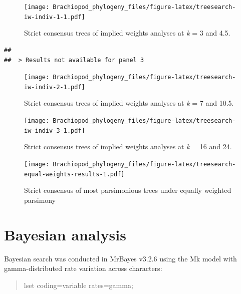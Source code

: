 \documentclass[openany]{book}
\begin{document}
\clearpage 

\begin{figure}
\centering
\texttt{[image: Brachiopod\_phylogeny\_files/figure-latex/treesearch-iw-indiv-1-1.pdf]}
\caption{\label{fig:treesearch-iw-indiv-1}Strict consensus trees of implied weights analyses
at \emph{k} = 3 and 4.5.}
\end{figure}

\clearpage 

\begin{verbatim}
## 
##  > Results not available for panel 3
\end{verbatim}

\begin{figure}
\centering
\texttt{[image: Brachiopod\_phylogeny\_files/figure-latex/treesearch-iw-indiv-2-1.pdf]}
\caption{\label{fig:treesearch-iw-indiv-2}Strict consensus trees of implied weights analyses
at \emph{k} = 7 and 10.5.}
\end{figure}

\clearpage 

\begin{figure}
\centering
\texttt{[image: Brachiopod\_phylogeny\_files/figure-latex/treesearch-iw-indiv-3-1.pdf]}
\caption{\label{fig:treesearch-iw-indiv-3}Strict consensus trees of implied weights analyses
at \emph{k} = 16 and 24.}
\end{figure}

\clearpage

\begin{figure}
\centering
\texttt{[image: Brachiopod\_phylogeny\_files/figure-latex/treesearch-equal-weights-results-1.pdf]}
\caption{\label{fig:treesearch-equal-weights-results}Strict consensus of
most parsimonious trees under equally weighted parsimony}
\end{figure}

\clearpage

\hypertarget{bayesian}{\chapter{Bayesian analysis}\label{bayesian}}

Bayesian search was conducted in MrBayes v3.2.6 \citep{Ronquist2012}
using the Mk model \citep{Lewis2001} with gamma-distributed rate
variation across characters:

\begin{quote}
lset coding=variable rates=gamma;
\end{quote}
\end{document}
